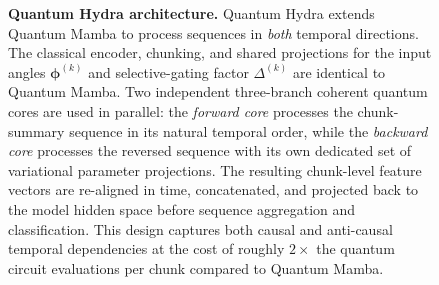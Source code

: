 \begin{figure}[t]
{%
}
\caption{%
\textbf{Quantum Hydra architecture.}
Quantum Hydra extends Quantum Mamba to process sequences in \emph{both} temporal directions.
The classical encoder, chunking, and shared projections for the input angles $\boldsymbol{\phi}^{(k)}$ and selective-gating factor $\Delta^{(k)}$ are identical to Quantum Mamba.
Two independent three-branch coherent quantum cores are used in parallel: the \emph{forward core} processes the chunk-summary sequence in its natural temporal order, while the \emph{backward core} processes the reversed sequence with its own dedicated set of variational parameter projections.
The resulting chunk-level feature vectors are re-aligned in time, concatenated, and projected back to the model hidden space before sequence aggregation and classification.
This design captures both causal and anti-causal temporal dependencies at the cost of roughly $2\times$ the quantum circuit evaluations per chunk compared to Quantum Mamba.%
}
\label{fig:qhydra_architecture}
\end{figure}
